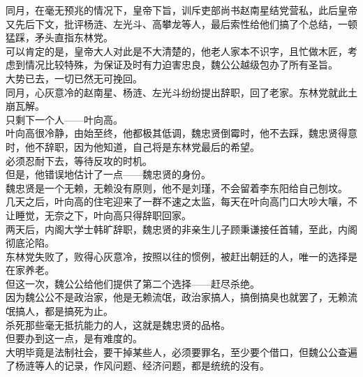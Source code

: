 \begin{multicols}{\theparacolNo}
同月，在毫无预兆的情况下，皇帝下旨，训斥吏部尚书赵南星结党营私，此后皇帝又先后下文，批评杨涟、左光斗、高攀龙等人，最后索性给他们搞了个总结，一顿猛踩，矛头直指东林党。\\

可以肯定的是，皇帝大人对此是不大清楚的，他老人家本不识字，且忙做木匠，考虑到情况比较特殊，为保证及时有力迫害忠良，魏公公越级包办了所有圣旨。\\

大势已去，一切已然无可挽回。\\

同月，心灰意冷的赵南星、杨涟、左光斗纷纷提出辞职，回了老家。东林党就此土崩瓦解。\\

只剩下一个人——叶向高。\\

叶向高很冷静，由始至终，他都极其低调，魏忠贤倒霉时，他不去踩，魏忠贤得意时，他不辞职，因为他知道，自己将是东林党最后的希望。\\

必须忍耐下去，等待反攻的时机。\\

但是，他错误地估计了一点——魏忠贤的身份。\\

魏忠贤是一个无赖，无赖没有原则，他不是刘瑾，不会留着李东阳给自己刨坟。\\

几天之后，叶向高的住宅迎来了一群不速之太监，每天在叶向高门口大吵大嚷，不让睡觉，无奈之下，叶向高只得辞职回家。\\

两天后，内阁大学士韩旷辞职，魏忠贤的非亲生儿子顾秉谦接任首辅，至此，内阁彻底沦陷。\\

东林党失败了，败得心灰意冷，按照以往的惯例，被赶出朝廷的人，唯一的选择是在家养老。\\

但这一次，魏公公给他们提供了第二个选择——赶尽杀绝。\\

因为魏公公不是政治家，他是无赖流氓，政治家搞人，搞倒搞臭也就罢了，无赖流氓搞人，都是搞死为止。\\

杀死那些毫无抵抗能力的人，这就是魏忠贤的品格。\\

但要办到这一点，是有难度的。\\

大明毕竟是法制社会，要干掉某些人，必须要罪名，至少要个借口，但魏公公查遍了杨涟等人的记录，作风问题、经济问题，都是统统的没有。\\


\end{multicols}
